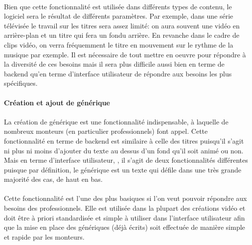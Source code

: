 \paragraph{}

Bien que cette fonctionnalité est utilisée dans différents types de
contenu, le logiciel sera le résultat de différents paramètres. Par
exemple, dans une série télévisée le travail sur les titres sera
assez limité: on aura souvent une vidéo en arrière-plan et un titre
qui fera un fondu arrière. En revanche dans le cadre de clips vidéo,
on verra fréquemment le titre en mouvement sur le rythme de la musique
par exemple. Il est nécessaire de tout mettre en oeuvre pour répondre
à la diversité de ces besoins mais il sera plus difficile aussi bien
en terme de backend qu'en terme d'interface utilisateur de répondre
aux besoins les plus spécifiques.

\paragraph{Création et ajout de générique}

\paragraph{}

La création de générique est une fonctionnalité indispensable,
à laquelle de nombreux monteurs (en particulier professionnels)
font appel. Cette fonctionnalité en terme de backend est similaire à
celle des titres puisqu'il s'agit ni plus ni moins d'ajouter du texte
au dessus d'un fond qu'il soit animé ou non. Mais en terme d'interface
utilisateur, , il s'agit
de deux fonctionnalités différentes puisque par définition, le
générique est un texte qui défile dans une très grande majorité
des cas, de haut en bas.

\paragraph{}

Cette fonctionnalité est l'une des plus basiques si l'on veut pouvoir
répondre aux besoins des professionnels. Elle est utilisée dans la
plupart des créations vidéo et doit être à priori standardisée et
simple à utiliser dans l'interface utilisateur afin que la mise en place
des génériques (déjà écrits) soit effectuée de manière simple et
rapide par les monteurs.

